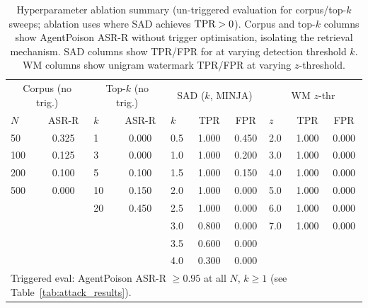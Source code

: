 \begin{table}[t]
\centering
\small
\caption{Hyperparameter ablation summary (un-triggered evaluation for corpus/top-$k$ sweeps;
         \sad{} ablation uses \minja{} where SAD achieves $\text{TPR}>0$).
         Corpus and top-$k$ columns show AgentPoison ASR-R without trigger optimisation,
         isolating the retrieval mechanism.  SAD columns show TPR/FPR for \minja{}
         at varying detection threshold $k$.  WM columns show unigram watermark TPR/FPR
         at varying $z$-threshold.}
\label{tab:ablation}
\begin{tabular}{lc|lc|lcc|lcc}
\toprule
\multicolumn{2}{c|}{Corpus (no trig.)} & \multicolumn{2}{c|}{Top-$k$ (no trig.)} & \multicolumn{3}{c|}{SAD ($k$, MINJA)} & \multicolumn{3}{c}{WM $z$-thr} \\
$N$ & ASR-R & $k$ & ASR-R & $k$ & TPR & FPR & $z$ & TPR & FPR \\
\midrule
50  & 0.325 & 1  & 0.000 & 0.5 & 1.000 & 0.450 & 2.0 & 1.000 & 0.000 \\
100 & 0.125 & 3  & 0.000 & 1.0 & 1.000 & 0.200 & 3.0 & 1.000 & 0.000 \\
200 & 0.100 & 5  & 0.100 & 1.5 & 1.000 & 0.150 & 4.0 & 1.000 & 0.000 \\
500 & 0.000 & 10 & 0.150 & 2.0 & 1.000 & 0.000 & 5.0 & 1.000 & 0.000 \\
    &       & 20 & 0.450 & 2.5 & 1.000 & 0.000 & 6.0 & 1.000 & 0.000 \\
    &       &    &       & 3.0 & 0.800 & 0.000 & 7.0 & 1.000 & 0.000 \\
    &       &    &       & 3.5 & 0.600 & 0.000 &     &       &       \\
    &       &    &       & 4.0 & 0.300 & 0.000 &     &       &       \\
\bottomrule
\multicolumn{10}{l}{\footnotesize Triggered eval: AgentPoison ASR-R $\geq 0.95$ at all $N$, $k \geq 1$ (see Table~\ref{tab:attack_results}).} \\
\end{tabular}
\end{table}
